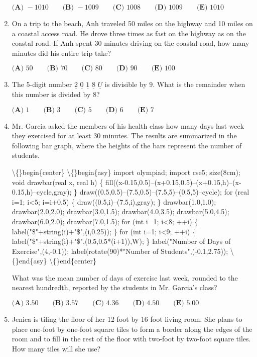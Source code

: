 \documentclass{article}
\begin{document}
\begin{enumerate}[label=\arabic*., itemsep=0.5em]
\(\textbf{(A) }-1010\qquad\textbf{(B) }-1009\qquad\textbf{(C) }1008\qquad\textbf{(D) }1009\qquad \textbf{(E) }1010\)\par \vspace{0.5em}\item On a trip to the beach, Anh traveled 50 miles on the highway and 10 miles on a coastal access road. He drove three times as fast on the highway as on the coastal road. If Anh spent 30 minutes driving on the coastal road, how many minutes did his entire trip take?

\(\textbf{(A) }50\qquad\textbf{(B) }70\qquad\textbf{(C) }80\qquad\textbf{(D) }90\qquad \textbf{(E) }100\)\par \vspace{0.5em}\item The \(5\)-digit number \(\underline{2}\) \(\underline{0}\) \(\underline{1}\) \(\underline{8}\) \(\underline{U}\) is divisible by \(9\). What is the remainder when this number is divided by \(8\)?

\(\textbf{(A) }1\qquad\textbf{(B) }3\qquad\textbf{(C) }5\qquad\textbf{(D) }6\qquad\textbf{(E) }7\)\par \vspace{0.5em}\item Mr. Garcia asked the members of his health class how many days last week they exercised for at least 30 minutes. The results are summarized in the following bar graph, where the heights of the bars represent the number of students.


\textbackslash\{\}begin\{center\}
\textbackslash\{\}begin\{asy\}
import olympiad;
import cse5;
size(8cm);
void drawbar(real x, real h) \{
  fill((x-0.15,0.5)--(x+0.15,0.5)--(x+0.15,h)--(x-0.15,h)--cycle,gray);
\}
draw((0.5,0.5)--(7.5,0.5)--(7.5,5)--(0.5,5)--cycle);
for (real i=1; i<5; i=i+0.5) \{
  draw((0.5,i)--(7.5,i),gray);
\}
drawbar(1.0,1.0);
drawbar(2.0,2.0);
drawbar(3.0,1.5);
drawbar(4.0,3.5);
drawbar(5.0,4.5);
drawbar(6.0,2.0);
drawbar(7.0,1.5);
for (int i=1; i<8; ++i) \{
  label("\$"+string(i)+"\$",(i,0.25));
\}
for (int i=1; i<9; ++i) \{
  label("\$"+string(i)+"\$",(0.5,0.5*(i+1)),W);
\}
label("Number of Days of Exercise",(4,-0.1));
label(rotate(90)*"Number of Students",(-0.1,2.75));
\textbackslash\{\}end\{asy\}
\textbackslash\{\}end\{center\}

What was the mean number of days of exercise last week, rounded to the nearest hundredth, reported by the students in Mr. Garcia's class?

\(\textbf{(A) } 3.50 \qquad \textbf{(B) } 3.57 \qquad \textbf{(C) } 4.36 \qquad \textbf{(D) } 4.50 \qquad \textbf{(E) } 5.00\)\par \vspace{0.5em}\item Jenica is tiling the floor of her 12 foot by 16 foot living room. She plans to place one-foot by one-foot square tiles to form a border along the edges of the room and to fill in the rest of the floor with two-foot by two-foot square tiles. How many tiles will she use?


\end{enumerate}
\end{document}
